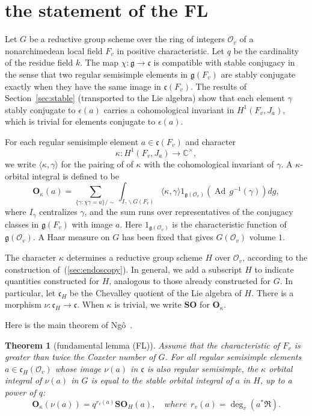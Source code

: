 \documentclass[brochure,english,12pt]{bourbaki}
\theoremstyle{plain}
\newtheorem{theorem}[equation]{Theorem}
\def\op#1{{\operatorname{#1}}}
\newcommand{\ring}[1]{\mathbb{#1}}
\def\SO{{\mathbf {SO}}}
\def\OO{{\mathbf O}}
\def\g{\mathfrak{g}}
\def\cc{\mathfrak{c}}
\def\RDIV{{\mathfrak{R}}}
\def\O{{\mathcal O}}
\begin{document}
\section{the statement of the FL}\label{sec:statement}

Let $G$ be a reductive group scheme over the ring of integers $\O_v$ of
a nonarchimedean local field $F_v$ in positive characteristic.  Let $q$ be the cardinality
of the residue field $k$.  The map $\chi:\g\to\cc$
is compatible with stable conjugacy in the sense that two
regular semisimple elements in $\g(F_v)$ are stably conjugate exactly
when they have the same image in $\cc(F_v)$.    The results of
Section~\ref{sec:stable} (transported to the Lie algebra)
show that each element $\gamma$ stably conjugate to
$\epsilon(a)$ carries a cohomological invariant in $H^1(F_v,J_a)$, which is trivial for
elements conjugate to $\epsilon(a)$. 

For each regular semisimple element $a\in \cc(F_v)$ and character 
\[
\kappa:H^1(F_v,J_a)\to\ring{C}^\times,
\]
we write
 $\langle\kappa,\gamma\rangle$ for the pairing of
of $\kappa$ with the cohomological invariant of $\gamma$.
A 
$\kappa$-orbital integral is defined to be
\begin{equation}\label{eqn:k-orbital}
\OO_\kappa(a) = \sum_ {\{\gamma:\chi\gamma= a\}/\sim} 
\int_{I_\gamma\backslash G(F_v)} \langle\kappa,\gamma\rangle 
1_{\g(\O_v)} (\op{Ad}\, g^{-1}(\gamma)) dg,
\end{equation}
where $I_\gamma$ centralizes $\gamma$, and the sum runs over
representatives of the conjugacy classes in $\g(F_v)$ with image $a$.
Here $1_{\g(\O_v)}$ is the characteristic function of $\g(\O_v)$.  A
Haar measure on $G$ has been fixed that gives $G(\O_v)$ volume $1$.


The character $\kappa$ determines a reductive group scheme $H$ over
$\O_v$, according to the construction of~(\ref{sec:endoscopy}).
In general, we add
a subscript $H$ to indicate quantities constructed for $H$, analogous
to those already constructed for $G$.  In particular,
let $\cc_H$ be the Chevalley quotient of the Lie algebra of $H$. There is
a morphism $\nu:\cc_H\to\cc$.    When $\kappa$ is trivial, we
write $\SO$ for $\OO_\kappa$.

Here is the main theorem of Ng\^o~\cite{NBC:2010}.

\begin{theorem}[fundamental lemma (FL)]
  Assume that the characteristic of $F_v$ is greater than twice the
  Coxeter number of $G$.  For all regular semisimple elements $a\in
  \cc_H(\O_v)$ whose image $\nu(a)$ in $\cc$ is also regular
  semisimple, the $\kappa$ orbital integral of $\nu(a)$ in $G$ is
  equal to the stable orbital integral of $a$ in $H$, up to a power of
  $q$:
\begin{equation}\label{eqn:fl}
\OO_\kappa(\nu(a)) = q^{r_v(a)}\SO_H(a),\quad{ where~~ } r_v(a) = \deg_v(a^*\RDIV).
\end{equation}
\end{theorem}
\end{document}
